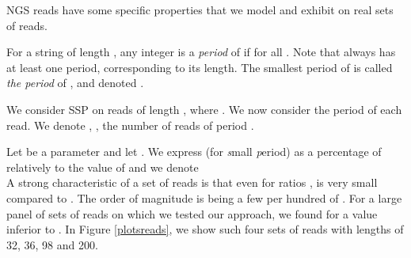 \documentclass[10pt]{article}
\begin{document}
NGS reads have some specific properties that we model and exhibit on
real sets of reads.

For a string  of length , any integer  is a
\emph{period} of  if  for all . Note that  always has at least one period, corresponding to its
length. The smallest period of  is called \emph{the period} of ,
and denoted .


We consider SSP on  reads  of length
, where . We now consider the period of each read. We
denote , , the number of reads of period . 



Let  be a parameter and let . We express  (for {\em s}mall {\em p}eriod) as a percentage
of  relatively to the value of  and we
denote  \\

A strong characteristic of a set of reads is that even for ratios ,  is very small compared to . The order of
magnitude is  being a few per hundred of . For a
large panel of sets of reads on which we tested our approach, we found
for  a  value inferior to . In
Figure \ref{plotsreads}, we show such four sets of reads with lengths
of 32, 36, 98 and 200.
\end{document}

